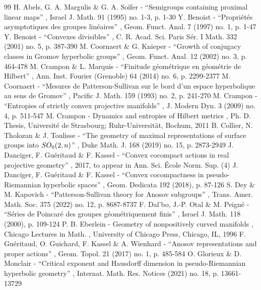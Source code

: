 \documentclass[11pt]{article}
\numberwithin{equation}{section}
\theoremstyle{definition}
\begin{document}
\begin{thebibliography}{99}
 H. Abels, G. A. Margulis \& G. A. Soĭfer - “Semigroups containing proximal linear maps” , Israel J. Math. 91 (1995) no. 1-3, p. 1-30
 Y. Benoist - “Propriétés asymptotiques des groupes linéaires” , Geom. Funct. Anal. 7 (1997) no. 1, p. 1-47
 Y. Benoist - “Convexes divisibles” , C. R. Acad. Sci. Paris Sér. I Math. 332 (2001) no. 5, p. 387-390
 M. Coornaert \& G. Knieper - “Growth of conjugacy classes in Gromov hyperbolic groups” , Geom. Funct. Anal. 12 (2002) no. 3, p. 464-478
 M. Crampon \& L. Marquis - “Finitude géométrique en géométrie de Hilbert” , Ann. Inst. Fourier (Grenoble) 64 (2014) no. 6, p. 2299-2377
 M. Coornaert - “Mesures de Patterson-Sullivan sur le bord d’un espace hyperbolique au sens de Gromov” , Pacific J. Math. 159 (1993) no. 2, p. 241-270
 M. Crampon - “Entropies of strictly convex projective manifolds” , J. Modern Dyn. 3 (2009) no. 4, p. 511-547
 M. Crampon - Dynamics and entropies of Hilbert metrics , Ph. D. Thesis, Université de Strasbourg; Ruhr-Universität, Bochum, 2011
 B. Collier, N. Tholozan \& J. Toulisse - “The geometry of maximal representations of surface groups into ${\rm SO}_0(2,n)$” , Duke Math. J. 168 (2019) no. 15, p. 2873-2949
 J. Danciger, F. Guéritaud \& F. Kassel - “Convex cocompact actions in real projective geometry” , 2017, to appear in Ann. Sci. École Norm. Sup. (4)
 J. Danciger, F. Guéritaud \& F. Kassel - “Convex cocompactness in pseudo-Riemannian hyperbolic spaces” , Geom. Dedicata 192 (2018), p. 87-126
 S. Dey \& M. Kapovich - “Patterson-Sullivan theory for Anosov subgroups” , Trans. Amer. Math. Soc. 375 (2022) no. 12, p. 8687-8737
 F. Dal’bo, J.-P. Otal \& M. Peigné - “Séries de Poincaré des groupes géométriquement finis” , Israel J. Math. 118 (2000), p. 109-124
 P. B. Eberlein - Geometry of nonpositively curved manifolds , Chicago Lectures in Math. , University of Chicago Press, Chicago, IL, 1996
 F. Guéritaud, O. Guichard, F. Kassel \& A. Wienhard - “Anosov representations and proper actions” , Geom. Topol. 21 (2017) no. 1, p. 485-584
 O. Glorieux \& D. Monclair - “Critical exponent and Hausdorff dimension in pseudo-Riemannian hyperbolic geometry” , Internat. Math. Res. Notices (2021) no. 18, p. 13661-13729

\end{thebibliography}
\end{document}
